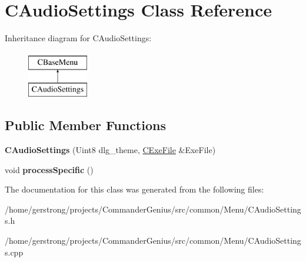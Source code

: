 \hypertarget{class_c_audio_settings}{
\section{CAudioSettings Class Reference}
\label{class_c_audio_settings}
}
Inheritance diagram for CAudioSettings:\begin{figure}[H]
\begin{center}
\leavevmode
\includegraphics[height=2cm]{class_c_audio_settings}
\end{center}
\end{figure}
\subsection*{Public Member Functions}
\begin{DoxyCompactItemize}
\item 
\hypertarget{class_c_audio_settings_a41a76ac65b0ae9ac6df4f25914ab4c52}{
{\bfseries CAudioSettings} (Uint8 dlg\_\-theme, \hyperlink{class_c_exe_file}{CExeFile} \&ExeFile)}
\label{class_c_audio_settings_a41a76ac65b0ae9ac6df4f25914ab4c52}

\item 
\hypertarget{class_c_audio_settings_a06fe1415895ffce540e3f37c7653e18b}{
void {\bfseries processSpecific} ()}
\label{class_c_audio_settings_a06fe1415895ffce540e3f37c7653e18b}

\end{DoxyCompactItemize}


The documentation for this class was generated from the following files:\begin{DoxyCompactItemize}
\item 
/home/gerstrong/projects/CommanderGenius/src/common/Menu/CAudioSettings.h\item 
/home/gerstrong/projects/CommanderGenius/src/common/Menu/CAudioSettings.cpp\end{DoxyCompactItemize}
